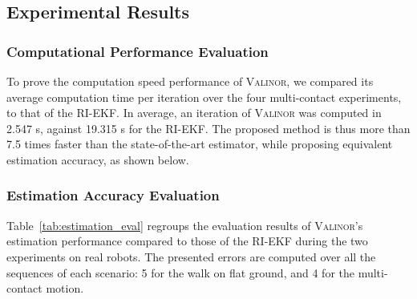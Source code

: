 \documentclass{IJCAS}
\begin{document}
\subsection{Experimental Results}

\subsubsection{Computational Performance Evaluation}\label{subsec:computation_time}

To prove the computation speed performance of {\scshape Valinor}, we compared its average computation time per iteration over the four multi-contact experiments, to that of the RI-EKF. In average, an iteration of {\scshape Valinor} was computed in 2.547 \textmu s, against 19.315 \textmu s for the RI-EKF. The proposed method is thus more than 7.5 times faster than the state-of-the-art estimator, while proposing equivalent estimation accuracy, as shown below.

\subsubsection{Estimation Accuracy Evaluation}

Table~\ref{tab:estimation_eval} regroups the evaluation results of {\scshape Valinor}'s estimation performance compared to those of the RI-EKF during the two experiments on real robots.
The presented errors are computed over all the sequences of each scenario: 5 for the walk on flat ground, and 4 for the multi-contact motion.
\end{document}
